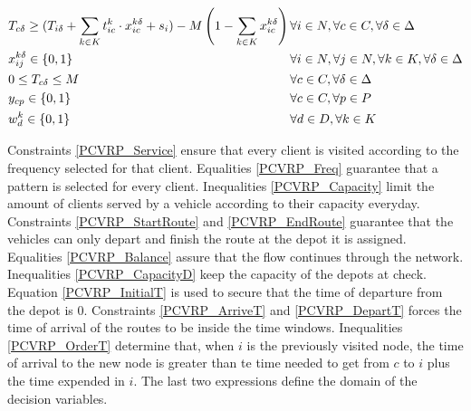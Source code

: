 \documentclass[preprint,review,12pt]{elsarticle}
\begin{document}
\begin{align}
	& T_{c\delta} \geq (T_{i\delta} + \sum\limits_{k \in K} t_{ic}^k \cdot  x_{ic}^{k\delta} + s_i) - M \left(1 - \sum\limits_{k \in K}x_{ic}^{k\delta} \right) \qquad && \text{\hspace{-1cm}} \forall i \in N, \forall c \in C, \forall \delta \in \Delta \label{PCVRP_OrderT}\\
	& x_{ij}^{k\delta} \in\{0,1\} && \text{\hspace{-1cm}} \forall i \in N, \forall j \in N, \forall k \in K,\forall \delta \in \Delta \label{PCVRP_DomainX}\\
	& 0 \leq T_{c\delta} \leq M && \text{\hspace{-1cm}} \forall c \in C, \forall \delta \in \Delta \label{PCVRP_DomainT}\\
	& y_{cp} \in\{0,1\} && \text{\hspace{-1cm}} \forall c \in C, \forall p \in P \label{PCVRP_DomainY}\\
	& w_d^k \in\{0,1\} && \text{\hspace{-1cm}} \forall d \in D, \forall k \in K \label{PCVRP_DomainW}
\end{align}

Constraints \eqref{PCVRP_Service} ensure that every client is visited according to the frequency selected for that client. Equalities \eqref{PCVRP_Freq} guarantee that a pattern is selected for every client. Inequalities \eqref{PCVRP_Capacity} limit the amount of clients served by a vehicle according to their capacity everyday. Constraints \eqref{PCVRP_StartRoute} and \eqref{PCVRP_EndRoute} guarantee that the vehicles can only depart and finish the route at the depot it is assigned. Equalities \eqref{PCVRP_Balance} assure that the flow continues through the network. Inequalities \eqref{PCVRP_CapacityD} keep the capacity of the depots at check. Equation \eqref{PCVRP_InitialT} is used to secure that the time of departure from the depot is 0. Constraints \eqref{PCVRP_ArriveT} and \eqref{PCVRP_DepartT} forces the time of arrival of the routes to be inside the time windows. Inequalities \eqref{PCVRP_OrderT} determine that, when $i$ is the previously visited node, the time of arrival to the new node is greater than te time needed to get from $c$ to $i$ plus the time expended in $i$. The last two expressions define the domain of the decision variables.
\end{document}
